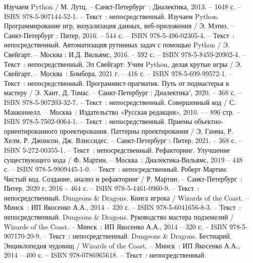 
\begin{thebibliography}{9}

     Изучаем Python / М. Лутц. – Санкт-Петербург~: Диалектика, 2013. – 1648 с. – ISBN 978-5-907144-52-1. – Текст~: непосредственный.
     Изучаем Python. Программирование игр, визуализация данных, веб-приложения / Э. Мэтиз. – Санкт-Петербург : Питер, 2016. – 544 с. – ISBN 978-5-496-02305-4. – Текст~: непосредственный.
     Автоматизация рутинных задач с помощью Python / Э. Свейгарт. – Москва : И.Д. Вильямс, 2016. – 592 с. – ISBN 978-5-8459-20902-4. – Текст~: непосредственный.
    	Эл Свейгарт: Учим Python, делая крутые игры / Э. Свейгарт. – Москва~:  Бомбора, 2021 г. – 416 с. – ISBN 978-5-699-99572-1. – Текст~: непосредственный.
		Программист-прагматик. Путь от подмастерья к мастеру  / Э. Хант, Д. Томас. – Санкт-Петербург : Диалектика', 2020. – 368 с. – ISBN 978-5-907203-32-7. – Текст~: непосредственный.
		Совершенный код / С. Макконнелл. – Москва~: Издательство «Русская редакция», 2010. — 896 стр. – ISBN 978-5-7502-0064-1. – Текст~: непосредственный.
		Приемы объектно-ориентированного проектирования. Паттерны проектирования / Э. Гамма, Р. Хелм, Р. Джонсон, Дж. Влиссидес. – Санкт-Петербург : Питер, 2021. – 368 с. – ISBN 5-272-00355-1. – Текст~: непосредственный.
		Рефакторинг. Улучшение существующего кода / Ф. Мартин. – Москва~: Диалектика-Вильямс, 2019 – 448 с. – ISBN 978-5-9909445-1-0. – Текст~: непосредственный.
		Роберт Мартин: Чистый код. Создание, анализ и рефакторинг / Р. Мартин. – Санкт-Петербург~: Питер, 2020 г, 2016 – 464 с. – ISBN 978-5-4461-0960-9. – Текст~: непосредственный.    
		Dungeons \& Dragons. Книга игрока / Wizards of the Coast. – Минск~: ИП Якосенко А.А., 2014 – 320 с. – ISBN 978-5-6041656-8-3. – Текст~: непосредственный.    
		Dungeons \& Dragons. Руководство мастера подземелий /  Wizards of the Coast. – Минск~: ИП Якосенко А.А., 2014 – 320 с. – ISBN 978-5-907170-20-9. – Текст~: непосредственный.    
		Dungeons \& Dragons. Бестиарий. Энциклопедия чудовищ / Wizards of the Coast. – Минск~: ИП Якосенко А.А., 2014 – 400 с. – ISBN 978-0786965618. – Текст~: непосредственный.
\end{thebibliography}
